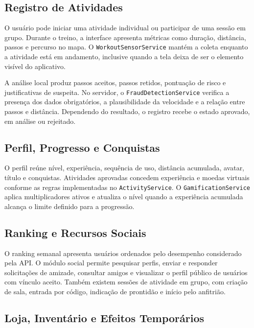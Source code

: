 \subsection{Registro de Atividades}

O usuário pode iniciar uma atividade individual ou participar de uma sessão em grupo. Durante o treino, a interface apresenta métricas como duração, distância, passos e percurso no mapa. O \texttt{WorkoutSensorService} mantém a coleta enquanto a atividade está em andamento, inclusive quando a tela deixa de ser o elemento visível do aplicativo.

A análise local produz passos aceitos, passos retidos, pontuação de risco e justificativas de suspeita. No servidor, o \texttt{FraudDetectionService} verifica a presença dos dados obrigatórios, a plausibilidade da velocidade e a relação entre passos e distância. Dependendo do resultado, o registro recebe o estado aprovado, em análise ou rejeitado.

\subsection{Perfil, Progresso e Conquistas}

O perfil reúne nível, experiência, sequência de uso, distância acumulada, avatar, título e conquistas. Atividades aprovadas concedem experiência e moedas virtuais conforme as regras implementadas no \texttt{ActivityService}. O \texttt{GamificationService} aplica multiplicadores ativos e atualiza o nível quando a experiência acumulada alcança o limite definido para a progressão.

\subsection{Ranking e Recursos Sociais}

O ranking semanal apresenta usuários ordenados pelo desempenho considerado pela API. O módulo social permite pesquisar perfis, enviar e responder solicitações de amizade, consultar amigos e visualizar o perfil público de usuários com vínculo aceito. Também existem sessões de atividade em grupo, com criação de sala, entrada por código, indicação de prontidão e início pelo anfitrião.

\subsection{Loja, Inventário e Efeitos Temporários}

